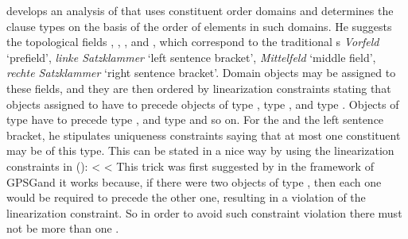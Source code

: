\documentclass[output=paper,biblatex,babelshorthands,newtxmath,draftmode,colorlinks,citecolor=brown]{langscibook}
\begin{document}
\citet{Kathol2001a} develops an analysis of  that uses constituent order domains and determines the
clause types on the basis of the order of elements in such domains. He suggests the topological
fields , , , and , which correspond to the traditional
s \emph{Vorfeld} `prefield', \emph{linke Satzklammer} `left sentence
bracket', \emph{Mittelfeld} `middle field', \emph{rechte Satzklammer} `right sentence
bracket'. Domain objects may be assigned to these fields, and they are then ordered by linearization
constraints stating that objects assigned to  have to precede objects of type ,
type , and type . Objects of type  have to precede type , and type
 and so on. For the \vf and the left sentence bracket, he stipulates uniqueness constraints saying
that at most one constituent may be of this type. This can be stated in a nice way by using
the linearization constraints in ():
\eal
\ex {} < 
\ex {} < 
\zl
This trick was first suggested by \citet[, Fn.\,3]{GKPS85a} in the framework of GPSG\indexgpsg and it works
because, if there were two objects of type , then each one would be required to precede the
other one, resulting in a violation of the linearization constraint. So in order to avoid such
constraint violation there must not be more than one .
\end{document}
